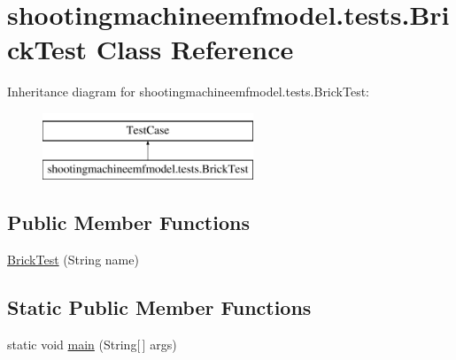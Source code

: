 \hypertarget{classshootingmachineemfmodel_1_1tests_1_1_brick_test}{\section{shootingmachineemfmodel.\-tests.\-Brick\-Test Class Reference}
\label{classshootingmachineemfmodel_1_1tests_1_1_brick_test}
}
Inheritance diagram for shootingmachineemfmodel.\-tests.\-Brick\-Test\-:\begin{figure}[H]
\begin{center}
\leavevmode
\includegraphics[height=2.000000cm]{classshootingmachineemfmodel_1_1tests_1_1_brick_test}
\end{center}
\end{figure}
\subsection*{Public Member Functions}
\begin{DoxyCompactItemize}
\item 
\hyperlink{classshootingmachineemfmodel_1_1tests_1_1_brick_test_af4cc39c74c39df3bd29125799042fa22}{Brick\-Test} (String name)
\end{DoxyCompactItemize}
\subsection*{Static Public Member Functions}
\begin{DoxyCompactItemize}
\item 
static void \hyperlink{classshootingmachineemfmodel_1_1tests_1_1_brick_test_a3494e2e2a902c7d04dae562d5d454c03}{main} (String\mbox{[}$\,$\mbox{]} args)
\end{DoxyCompactItemize}
